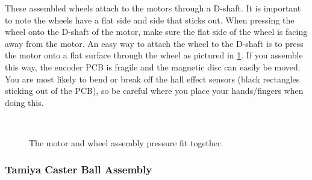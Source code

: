 These assembled wheels attach to the motors through a D-shaft. It is important to note the wheels have a flat side and side that sticks out. When pressing the wheel onto the D-shaft of the motor, make sure the flat side of the wheel is facing away from the motor. An easy way to attach the wheel to the D-shaft is to press the motor onto a flat surface through the wheel as pictured in \cref{fig:motorAssembly}. If you assemble this way, {\color{red}{be careful}} the encoder PCB is fragile and the magnetic disc can easily be moved. You are most likely to bend or break off the hall effect sensors (black rectangles sticking out of the PCB), so be careful where you place your hands/fingers when doing this.

\begin{figure}[h!]
\centering
{}
\hfill
{}\\
\caption{The motor and wheel assembly pressure fit together.}
\label{fig:motorAssembly}
\end{figure}

\subsubsection{Tamiya Caster Ball Assembly}
\label{sec:casterAssembly}

